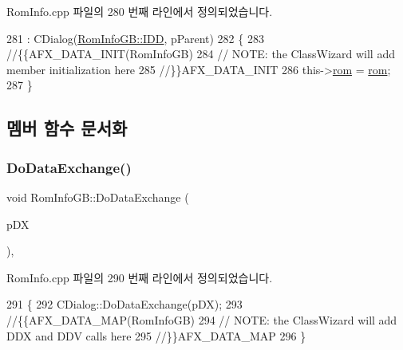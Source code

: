 Rom\+Info.\+cpp 파일의 280 번째 라인에서 정의되었습니다.


\begin{DoxyCode}
281   : CDialog(\mbox{\hyperlink{class_rom_info_g_b_a064c2e7a699087424ed18892356145f5aa168de60cf7ad6f99a78e4e9ffb7409c}{RomInfoGB::IDD}}, pParent)
282 \{
283   \textcolor{comment}{//\{\{AFX\_DATA\_INIT(RomInfoGB)}
284   \textcolor{comment}{// NOTE: the ClassWizard will add member initialization here}
285   \textcolor{comment}{//\}\}AFX\_DATA\_INIT}
286   this->\mbox{\hyperlink{class_rom_info_g_b_ab7ac87e9a9566fce1f057d7c37f60770}{rom}} = \mbox{\hyperlink{class_rom_info_g_b_ab7ac87e9a9566fce1f057d7c37f60770}{rom}};
287 \}
\end{DoxyCode}


\subsection{멤버 함수 문서화}
\mbox{\label{class_rom_info_g_b_aff85d9d0011b4b73cdf3ed85ecf64ff8}} 
\subsubsection{\texorpdfstring{Do\+Data\+Exchange()}{DoDataExchange()}}
{\footnotesize\ttfamily void Rom\+Info\+G\+B\+::\+Do\+Data\+Exchange (\begin{DoxyParamCaption}\item[{C\+Data\+Exchange $\ast$}]{p\+DX }\end{DoxyParamCaption})\hspace{0.3cm}{\ttfamily [protected]}, {\ttfamily [virtual]}}



Rom\+Info.\+cpp 파일의 290 번째 라인에서 정의되었습니다.


\begin{DoxyCode}
291 \{
292   CDialog::DoDataExchange(pDX);
293   \textcolor{comment}{//\{\{AFX\_DATA\_MAP(RomInfoGB)}
294   \textcolor{comment}{// NOTE: the ClassWizard will add DDX and DDV calls here}
295   \textcolor{comment}{//\}\}AFX\_DATA\_MAP}
296 \}
\end{DoxyCode}
\mbox{\label{class_rom_info_g_b_a91b078804aeeca8f6bc23479b1b3e839}} 
